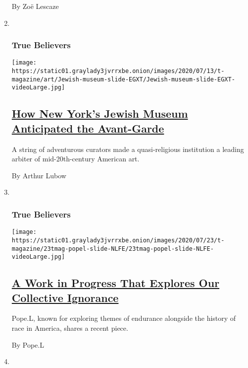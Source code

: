 \begin{enumerate}
  By Zoë Lescaze
\item ~
  \hypertarget{true-believers-6}{%
  \subsubsection{True Believers}\label{true-believers-6}}

  \texttt{[image: https://static01.graylady3jvrrxbe.onion/images/2020/07/13/t-magazine/art/Jewish-museum-slide-EGXT/Jewish-museum-slide-EGXT-videoLarge.jpg]}

  \hypertarget{how-new-yorks-jewish-museum-anticipated-the-avant-garde}{%
  \subsection{\texorpdfstring{\href{/2020/07/23/t-magazine/jewish-museum-new-york.html}{How
  New York's Jewish Museum Anticipated the
  Avant-Garde}}{How New York's Jewish Museum Anticipated the Avant-Garde}}\label{how-new-yorks-jewish-museum-anticipated-the-avant-garde}}

  A string of adventurous curators made a quasi-religious institution a
  leading arbiter of mid-20th-century American art.

  By Arthur Lubow
\item ~
  \hypertarget{true-believers-7}{%
  \subsubsection{True Believers}\label{true-believers-7}}

  \texttt{[image: https://static01.graylady3jvrrxbe.onion/images/2020/07/23/t-magazine/23tmag-popel-slide-NLFE/23tmag-popel-slide-NLFE-videoLarge.jpg]}

  \hypertarget{a-work-in-progress-that-explores-our-collective-ignorance}{%
  \subsection{\texorpdfstring{\href{/2020/07/23/t-magazine/pope-l-i-machine.html}{A
  Work in Progress That Explores Our Collective
  Ignorance}}{A Work in Progress That Explores Our Collective Ignorance}}\label{a-work-in-progress-that-explores-our-collective-ignorance}}

  Pope.L, known for exploring themes of endurance alongside the history
  of race in America, shares a recent piece.

  By Pope.L
\item ~
  \hypertarget{true-believers-8}{%
}
\end{enumerate}
